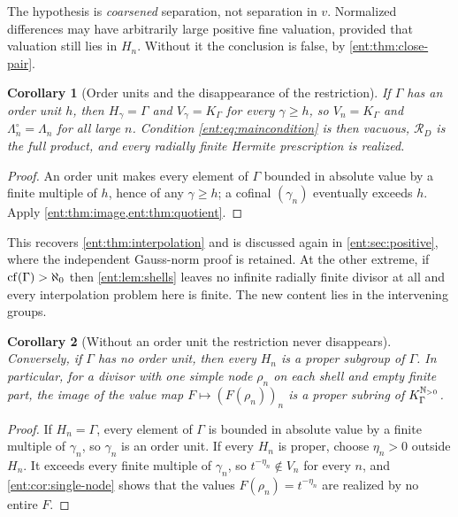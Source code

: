 \documentclass[11pt]{article}
\theoremstyle{plain}
\theoremstyle{plain}
\theoremstyle{plain}
\newtheorem{corollary}[corollary]{Corollary}
\theoremstyle{definition}
\theoremstyle{definition}
\theoremstyle{definition}
\theoremstyle{definition}
\theoremstyle{remark}
\newcommand{\K}{K_\Gamma}\newcommand{\KD}{K_\Delta}
\newcommand{\RD}{\mathcal R_D}\newcommand{\Ucal}{\mathcal U}
\begin{document}
The hypothesis is \emph{coarsened} separation, not separation in $v$.
Normalized differences may have arbitrarily large positive fine valuation,
provided that valuation still lies in $H_n$. Without it the conclusion is
false, by \cref{ent:thm:close-pair}.

\begin{corollary}[Order units and the disappearance of the restriction]
\label{ent:cor:order-unit-image}
If $\Gamma$ has an order unit $h$, then $H_\gamma=\Gamma$ and $V_\gamma=\K$
for every $\gamma\ge h$, so $V_n=\K$ and $\Lambda_n^\circ=\Lambda_n$ for all
large $n$. Condition \eqref{ent:eq:maincondition} is then vacuous, $\RD$ is
the full product, and every radially finite Hermite prescription is realized.
\end{corollary}
\begin{proof}
An order unit makes every element of $\Gamma$ bounded in absolute value by a
finite multiple of $h$, hence of any $\gamma\ge h$; a cofinal $(\gamma_n)$
eventually exceeds $h$. Apply \cref{ent:thm:image,ent:thm:quotient}.
\end{proof}

This recovers \cref{ent:thm:interpolation} and is discussed again in
\cref{ent:sec:positive}, where the independent Gauss-norm proof is retained.
At the other extreme, if $\operatorname{cf}(\Gamma)>\aleph_0$ then \cref{ent:lem:shells}
leaves no infinite radially finite divisor at all and every interpolation
problem here is finite. The new content lies in the intervening groups.

\begin{corollary}[Without an order unit the restriction never disappears]
\label{ent:sm:cor:no-order-unit}
Conversely, if $\Gamma$ has no order unit, then every $H_n$ is a proper
subgroup of $\Gamma$. In particular, for a divisor with one simple node
$\rho_n$ on each shell and empty finite part, the image of the value map
$F\mapsto(F(\rho_n))_n$ is a proper subring of $\K^{\N_{>0}}$.
\end{corollary}
\begin{proof}
If $H_n=\Gamma$, every element of $\Gamma$ is bounded in absolute value by a
finite multiple of $\gamma_n$, so $\gamma_n$ is an order unit. If every $H_n$
is proper, choose $\eta_n>0$ outside $H_n$. It exceeds every finite multiple
of $\gamma_n$, so $t^{-\eta_n}\notin V_n$ for every $n$, and
\cref{ent:cor:single-node} shows that the values $F(\rho_n)=t^{-\eta_n}$ are
realized by no entire $F$.
\end{proof}
\end{document}
